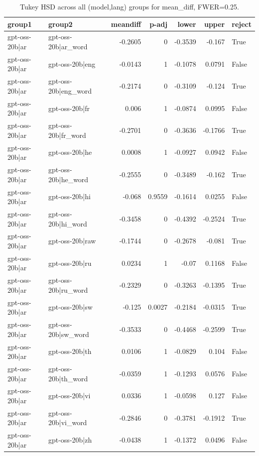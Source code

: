 \begin{table}
\caption{Tukey HSD across all (model,lang) groups for mean_diff, FWER=0.25.}
\label{tab:tukey_all_models_all_langs_mean_diff}
\begin{tabular}{l l r r r r l}
\toprule
group1 & group2 & meandiff & p-adj & lower & upper & reject \\
\midrule
gpt-oss-20b|ar & gpt-oss-20b|ar_word & -0.2605 & 0 & -0.3539 & -0.167 & True \\
gpt-oss-20b|ar & gpt-oss-20b|eng & -0.0143 & 1 & -0.1078 & 0.0791 & False \\
gpt-oss-20b|ar & gpt-oss-20b|eng_word & -0.2174 & 0 & -0.3109 & -0.124 & True \\
gpt-oss-20b|ar & gpt-oss-20b|fr & 0.006 & 1 & -0.0874 & 0.0995 & False \\
gpt-oss-20b|ar & gpt-oss-20b|fr_word & -0.2701 & 0 & -0.3636 & -0.1766 & True \\
gpt-oss-20b|ar & gpt-oss-20b|he & 0.0008 & 1 & -0.0927 & 0.0942 & False \\
gpt-oss-20b|ar & gpt-oss-20b|he_word & -0.2555 & 0 & -0.3489 & -0.162 & True \\
gpt-oss-20b|ar & gpt-oss-20b|hi & -0.068 & 0.9559 & -0.1614 & 0.0255 & False \\
gpt-oss-20b|ar & gpt-oss-20b|hi_word & -0.3458 & 0 & -0.4392 & -0.2524 & True \\
gpt-oss-20b|ar & gpt-oss-20b|raw & -0.1744 & 0 & -0.2678 & -0.081 & True \\
gpt-oss-20b|ar & gpt-oss-20b|ru & 0.0234 & 1 & -0.07 & 0.1168 & False \\
gpt-oss-20b|ar & gpt-oss-20b|ru_word & -0.2329 & 0 & -0.3263 & -0.1395 & True \\
gpt-oss-20b|ar & gpt-oss-20b|sw & -0.125 & 0.0027 & -0.2184 & -0.0315 & True \\
gpt-oss-20b|ar & gpt-oss-20b|sw_word & -0.3533 & 0 & -0.4468 & -0.2599 & True \\
gpt-oss-20b|ar & gpt-oss-20b|th & 0.0106 & 1 & -0.0829 & 0.104 & False \\
gpt-oss-20b|ar & gpt-oss-20b|th_word & -0.0359 & 1 & -0.1293 & 0.0576 & False \\
gpt-oss-20b|ar & gpt-oss-20b|vi & 0.0336 & 1 & -0.0598 & 0.127 & False \\
gpt-oss-20b|ar & gpt-oss-20b|vi_word & -0.2846 & 0 & -0.3781 & -0.1912 & True \\
gpt-oss-20b|ar & gpt-oss-20b|zh & -0.0438 & 1 & -0.1372 & 0.0496 & False \\

\end{tabular}
\end{table}
